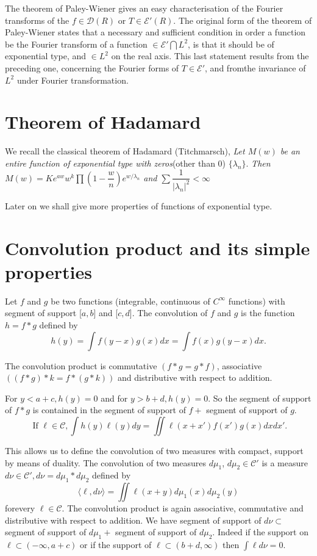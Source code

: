 The theorem of Paley-Wiener gives an easy characterisation of the
Fourier transforms of the $f \in \mathscr{D} (R)$ or $T \in
\mathscr{E}' (R)$. The original form of the theorem of Paley-Wiener
states that a necessary and sufficient condition in order a function
be the Fourier transform of a function $\in \mathscr{E}' \bigcap L^2$,
is that it should be of exponential type, and $\in L^2$ on the real
axis. This last statement results from the preceding one, concerning
the Fourier forms of $T \in \mathscr{E}'$, and from\pageoriginale the
invariance of $L^2$ under Fourier transformation. 

\section{Theorem of Hadamard}\label{chap3:sec3}%

We recall the classical theorem of Hadamard (Titchmarsch), \textit{Let
 $M(w)$ be an entire function of exponential type with zeros}(other
than $0$) $\{ \lambda_n \}$. \textit{Then $M(w) = K e^{aw} w^k \prod
 \left(1 - \dfrac{w}{n}\right) e^{w/\lambda_n}$ and $\sum \dfrac{1}{|
 \lambda_n |^2} < \infty$} 

Later on we shall give more properties of functions of exponential type.

\section{Convolution product and its simple properties}\label{chap3:sec4}%

Let $f$ and $g$ be two functions (integrable, continuous of
$C^{\infty}$ functions) with segment of support [$a, b$] and [$c,
 d$]. The convolution of $f$ and $g$ is the function $h = f* g$
defined by 
$$
h(y) = \int f(y-x) g(x) dx = \int f(x) g(y - x) dx.
$$

The convolution product is commutative $(f* g = g * f)$, associative
$((f * g) * k = f * (g * k))$ and distributive with respect to
addition. 

For $y < a + c, h (y) = 0$ and for $y > b + d, h(y) = 0$. So the
segment of support of $f * g$ is contained in the segment of support
of $f + $ segment of support of $g$. 
$$
\text{ If } \ell \in \mathscr{C}, \int h(y) \ell (y) dy = \iint \ell
(x + x') f(x') g(x) dxdx'. 
$$

 This allows us to define the convolution of two measures with
 compact, support by means of duality. The convolution of two measures
 $d \mu_1$, $d \mu_2 \in \mathscr{C}'$ is a measure $d \nu \in
 \mathscr{C}', d\nu = d \mu_1 * d \mu_2$ defined by 
$$
\langle \ell, d\nu \rangle = \iint \ell (x + y) d\mu_1 (x) d\mu_2 (y)
$$
for\pageoriginale every $\ell \in \mathscr{C}$. The convolution product is again
associative, commutative and distributive with respect to addition. We
have segment of support of $d \nu \subset$ segment of support of $d
\mu_1 + $ segment of support of $d \mu_2$. Indeed if the support on
$\ell \subset (-\infty, a + c)$ or if the support of $\ell \subset (b
+ d, \infty)$ then $\int \ell d \nu = 0$. 

